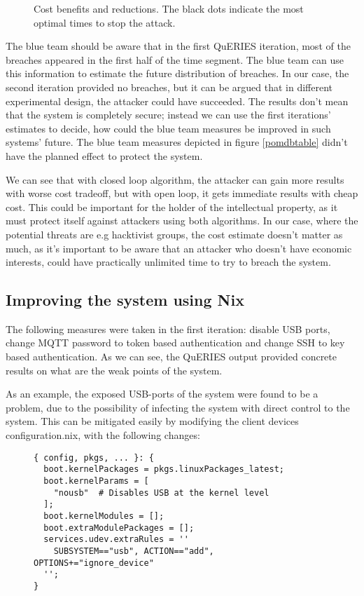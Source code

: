 \begin{figure}[t!]
\centerline{}
\caption{Cost benefits and reductions. The black dots indicate the
  most optimal times to stop the attack.}
\label{openandclosed}
\end{figure}

The blue team should be aware that in the first QuERIES iteration,
most of the breaches appeared in the first half of the time
segment. The blue team can use this information to estimate the future
distribution of breaches. In our case, the second iteration provided
no breaches, but it can be argued that in different experimental
design, the attacker could have succeeded. The results don't mean
that the system is completely secure; instead we can use the first
iterations' estimates to decide, how could the blue team measures be
improved in such systems' future. The blue team measures depicted in
figure \ref{pomdbtable} didn't have the planned effect to protect the
system. 

We can see that with closed loop algorithm, the attacker can gain more
results with worse cost tradeoff, but with open loop, it gets
immediate results with cheap cost. This could be important for the
holder of the intellectual property, as it must protect itself against
attackers using both algorithms. In our case, where the potential
threats are e.g hacktivist groups, the cost estimate doesn't matter as
much, as it's important to be aware that an attacker who 
doesn't have economic interests, could have practically unlimited time
to try to breach the system.

\subsection{Improving the system using Nix}\label{improvingwithnix}

The following measures were taken in the first iteration: disable USB
ports, change MQTT password to token based authentication and change
SSH to key based authentication. As we can see, the QuERIES output
provided concrete results on what are the weak points of the system.

As an example, the exposed USB-ports of the system were found to be a
problem, due to the possibility of infecting the system with direct
control to the system. This can be mitigated easily by modifying the
client devices configuration.nix, with the following changes:

\begin{figure}[H]
\begin{lstlisting} 
{ config, pkgs, ... }: {
  boot.kernelPackages = pkgs.linuxPackages_latest;
  boot.kernelParams = [
    "nousb"  # Disables USB at the kernel level
  ];
  boot.kernelModules = [];
  boot.extraModulePackages = [];
  services.udev.extraRules = ''
    SUBSYSTEM=="usb", ACTION=="add", OPTIONS+="ignore_device"
  '';
}
\end{lstlisting}
\label{kernelsnippet}
\end{figure}

